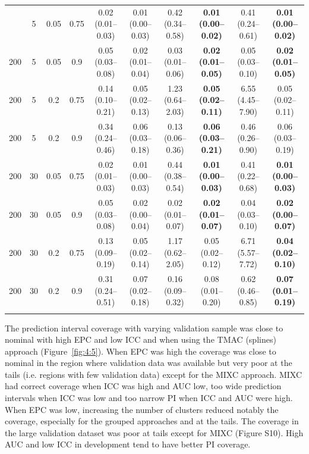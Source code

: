 \begin{table}
\begin{tabular}{cccc cccccc}
\addlinespace
200 & 5 & 0.05 & 0.75 & 0.02 (0.01--0.03) & 0.01 (0.00--0.03) & 0.42 (0.34--0.58) & \textbf{0.01 (0.00--0.02)} & 0.41 (0.24--0.61) & \textbf{0.01 (0.00--0.02)} \\
200 & 5 & 0.05 & 0.9 & 0.05 (0.03--0.08) & 0.02 (0.01--0.04) & 0.03 (0.01--0.06) & \textbf{0.02 (0.01--0.05)} & 0.05 (0.03--0.10) & \textbf{0.02 (0.01--0.05)} \\
200 & 5 & 0.2 & 0.75 & 0.14 (0.10--0.21) & 0.05 (0.02--0.13) & 1.23 (0.64--2.03) & \textbf{0.05 (0.02--0.11)} & 6.55 (4.45--7.90) & 0.05 (0.02--0.11) \\
200 & 5 & 0.2 & 0.9 & 0.34 (0.24--0.46) & 0.06 (0.03--0.18) & 0.13 (0.06--0.36) & \textbf{0.06 (0.03--0.21)} & 0.46 (0.26--0.90) & 0.06 (0.03--0.19) \\
200 & 30 & 0.05 & 0.75 & 0.02 (0.01--0.03) & 0.01 (0.00--0.03) & 0.44 (0.38--0.54) & \textbf{0.01 (0.00--0.03)} & 0.41 (0.22--0.68) & \textbf{0.01 (0.00--0.03)} \\
200 & 30 & 0.05 & 0.9 & 0.05 (0.03--0.08) & 0.02 (0.00--0.04) & 0.02 (0.01--0.07) & \textbf{0.02 (0.01--0.07)} & 0.04 (0.03--0.10) & \textbf{0.02 (0.00--0.07)} \\
200 & 30 & 0.2 & 0.75 & 0.13 (0.09--0.19) & 0.05 (0.02--0.14) & 1.17 (0.62--2.05) & 0.05 (0.02--0.12) & 6.71 (5.57--7.72) & \textbf{0.04 (0.02--0.10)} \\
200 & 30 & 0.2 & 0.9 & 0.31 (0.24--0.51) & 0.07 (0.02--0.18) & 0.16 (0.09--0.32) & 0.08 (0.01--0.20) & 0.62 (0.46--0.85) & \textbf{0.07 (0.01--0.19)} \\
\bottomrule
\addlinespace[0.5em]
\multicolumn{10}{l}{\textsuperscript{a}Deciles are calculated only with 10 points instead of 100.}
\end{tabular}
\end{table}

The prediction interval coverage with varying validation sample was close to nominal with high \gls{EPC} and low \gls{ICC} and when using the \gls{TMAC} (splines) approach (Figure~\ref{fig:4:5}). When \gls{EPC} was high the coverage was close to nominal in the region where validation data was available but very poor at the tails (i.e. regions with few validation data) except for the \gls{MIXC} approach. \gls{MIXC} had correct coverage when \gls{ICC} was high and \gls{AUC} low, too wide prediction intervals when \gls{ICC} was low and too narrow \gls{PI} when \gls{ICC} and \gls{AUC} were high. When \gls{EPC} was low, increasing the number of clusters reduced notably the coverage, especially for the grouped approaches and at the tails. The coverage in the large validation dataset was poor at tails except for \gls{MIXC} (Figure S10). High \gls{AUC} and low \gls{ICC} in development tend to have better \gls{PI} coverage.

